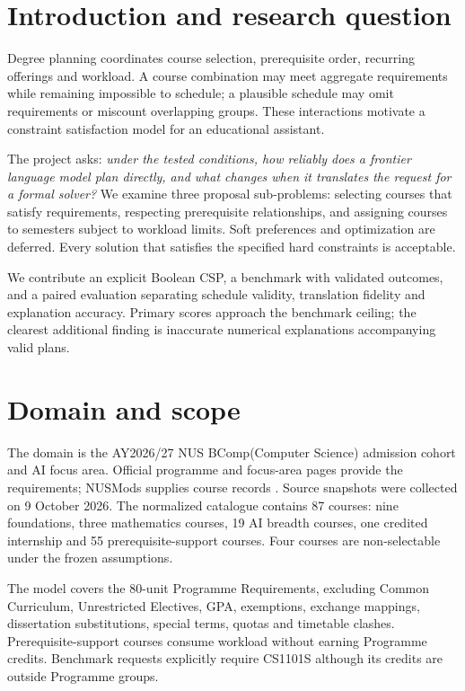 \documentclass[11pt,a4paper]{article}
\begin{document}
\section{Introduction and research question}
Degree planning coordinates course selection, prerequisite order, recurring
offerings and workload. A course combination may meet aggregate requirements
while remaining impossible to schedule; a plausible schedule may omit
requirements or miscount overlapping groups. These interactions motivate a
constraint satisfaction model for an educational assistant.

The project asks: \emph{under the tested conditions, how reliably does a frontier
language model plan directly, and what changes when it translates the request
for a formal solver?} We examine three proposal sub-problems: selecting courses
that satisfy requirements, respecting prerequisite relationships, and assigning
courses to semesters subject to workload limits. Soft preferences and
optimization are deferred. Every solution that satisfies the specified hard
constraints is acceptable.

We contribute an explicit Boolean CSP, a benchmark with validated outcomes,
and a paired evaluation separating schedule validity, translation fidelity
and explanation accuracy. Primary scores approach the benchmark ceiling;
the clearest additional finding is inaccurate numerical explanations
accompanying valid plans.

\section{Domain and scope}
The domain is the AY2026/27 NUS BComp(Computer Science) admission cohort and AI
focus area. Official programme and focus-area pages provide the requirements;
NUSMods supplies course records \cite{nuscohort,nusfocus,nusmods}. Source
snapshots were collected on 9 October 2026. The normalized catalogue contains
87 courses: nine foundations, three mathematics courses, 19 AI breadth
courses, one credited internship and 55 prerequisite-support courses. Four
courses are non-selectable under the frozen assumptions.

The model covers the 80-unit Programme Requirements, excluding Common
Curriculum, Unrestricted Electives, GPA, exemptions, exchange mappings,
dissertation substitutions, special terms, quotas and timetable clashes.
Prerequisite-support courses consume workload without earning Programme
credits. Benchmark requests explicitly require CS1101S although its credits
are outside Programme groups.
\end{document}
